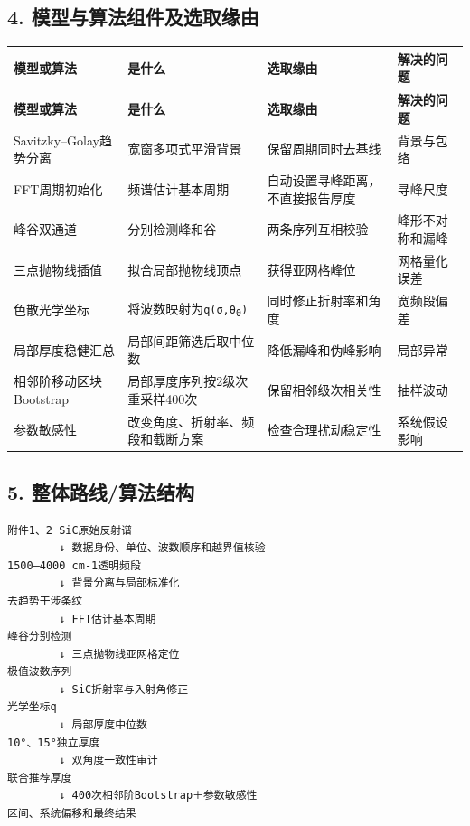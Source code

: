 \documentclass[11pt,a4paper]{ctexart}
\begin{document}
\subsection*{4. 模型与算法组件及选取缘由}
\begin{center}
\scriptsize
\begin{longtable}{|>{\raggedright\arraybackslash}p{}|>{\raggedright\arraybackslash}p{}|>{\raggedright\arraybackslash}p{}|>{\raggedright\arraybackslash}p{}|}
\hline
\textbf{模型或算法} & \textbf{是什么} & \textbf{选取缘由} & \textbf{解决的问题} \\ \hline
\endfirsthead
\hline \textbf{模型或算法} & \textbf{是什么} & \textbf{选取缘由} & \textbf{解决的问题} \\ \hline
\endhead
Savitzky–Golay趋势分离 & 宽窗多项式平滑背景 & 保留周期同时去基线 & 背景与包络 \\ \hline
FFT周期初始化 & 频谱估计基本周期 & 自动设置寻峰距离，不直接报告厚度 & 寻峰尺度 \\ \hline
峰谷双通道 & 分别检测峰和谷 & 两条序列互相校验 & 峰形不对称和漏峰 \\ \hline
三点抛物线插值 & 拟合局部抛物线顶点 & 获得亚网格峰位 & 网格量化误差 \\ \hline
色散光学坐标 & 将波数映射为\texttt{q(σ,θ\textsubscript{0})} & 同时修正折射率和角度 & 宽频段偏差 \\ \hline
局部厚度稳健汇总 & 局部间距筛选后取中位数 & 降低漏峰和伪峰影响 & 局部异常 \\ \hline
相邻阶移动区块Bootstrap & 局部厚度序列按2级次重采样400次 & 保留相邻级次相关性 & 抽样波动 \\ \hline
参数敏感性 & 改变角度、折射率、频段和截断方案 & 检查合理扰动稳定性 & 系统假设影响 \\ \hline
\end{longtable}
\normalsize
\end{center}
\subsection*{5. 整体路线/算法结构}
\begin{lstlisting}
附件1、2 SiC原始反射谱
        ↓ 数据身份、单位、波数顺序和越界值核验
1500—4000 cm-1透明频段
        ↓ 背景分离与局部标准化
去趋势干涉条纹
        ↓ FFT估计基本周期
峰谷分别检测
        ↓ 三点抛物线亚网格定位
极值波数序列
        ↓ SiC折射率与入射角修正
光学坐标q
        ↓ 局部厚度中位数
10°、15°独立厚度
        ↓ 双角度一致性审计
联合推荐厚度
        ↓ 400次相邻阶Bootstrap＋参数敏感性
区间、系统偏移和最终结果
\end{lstlisting}
\end{document}
